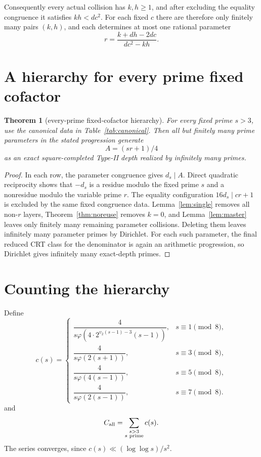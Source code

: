 \documentclass[11pt]{article}
\newtheorem{theorem}{Theorem}
\theoremstyle{definition}
\begin{document}
Consequently every actual collision has $k,h\ge1$, and after excluding the equality congruence it satisfies $kh<dc^2$. For each fixed $c$ there are therefore only finitely many pairs $(k,h)$, and each determines at most one rational parameter
\[
r=\frac{k+dh-2dc}{dc^2-kh}.
\]

\section{A hierarchy for every prime fixed cofactor}
\begin{theorem}[every-prime fixed-cofactor hierarchy]\label{thm:allprime}
For every fixed prime $s>3$, use the canonical data in Table~\ref{tab:canonical}. Then all but finitely many prime parameters in the stated progression generate
\[
\boxed{A=(sr+1)/4}
\]
as an exact square-completed Type-II depth realized by infinitely many primes.
\end{theorem}

\begin{proof}
In each row, the parameter congruence gives $d_s\mid A$. Direct quadratic reciprocity shows that $-d_s$ is a residue modulo the fixed prime $s$ and a nonresidue modulo the variable prime $r$. The equality configuration $16d_s\mid cr+1$ is excluded by the same fixed congruence data. Lemma~\ref{lem:single} removes all non-$r$ layers, Theorem~\ref{thm:noreuse} removes $k=0$, and Lemma~\ref{lem:master} leaves only finitely many remaining parameter collisions. Deleting them leaves infinitely many parameter primes by Dirichlet. For each such parameter, the final reduced CRT class for the denominator is again an arithmetic progression, so Dirichlet gives infinitely many exact-depth primes.
\end{proof}

\section{Counting the hierarchy}
Define
\[
c(s)=
\begin{cases}
\dfrac{4}{s\varphi(4\cdot2^{v_2(s-1)-3}(s-1))},&s\equiv1\pmod8,\\[7pt]
\dfrac{4}{s\varphi(2(s+1))},&s\equiv3\pmod8,\\[7pt]
\dfrac{4}{s\varphi(4(s-1))},&s\equiv5\pmod8,\\[7pt]
\dfrac{4}{s\varphi(2(s-1))},&s\equiv7\pmod8.
\end{cases}
\]
and
\[
C_{\rm all}=\sum_{\substack{s>3\\s\text{ prime}}}c(s).
\]
The series converges, since $c(s)\ll(\log\log s)/s^2$.
\end{document}
